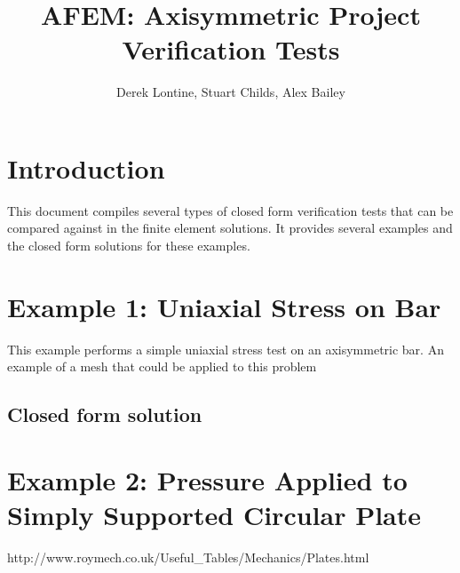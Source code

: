 \documentclass[10pt,letterpaper]{report}
\author{Derek Lontine, Stuart Childs, Alex Bailey}
\title{AFEM: Axisymmetric Project Verification Tests}
\numberwithin{equation}{chapter}
\begin{document}
\maketitle

\chapter{Introduction}
This document compiles several types of closed form verification tests that can be compared against in the finite element solutions. It provides several examples and the closed form solutions for these examples. 

\chapter{Example 1: Uniaxial Stress on Bar}
This example performs a simple uniaxial stress test on an axisymmetric bar. An example of a mesh that could be applied to this problem 

\section{Closed form solution}

\chapter{Example 2: Pressure Applied to Simply Supported Circular Plate}

http://www.roymech.co.uk/Useful_Tables/Mechanics/Plates.html
\end{document}
